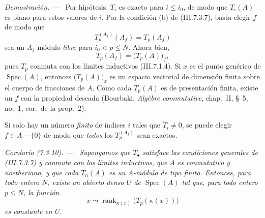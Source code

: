 \documentclass[10pt,oneside]{book}
\newcommand{\kres}{\kappa}
\newcommand{\Spec}{\operatorname{Spec}}
\newcommand{\sref}[2][]{\textup{(#2)}}
\newenvironment{corollary}[1][]{\par\medskip\noindent\itshape Corolario (#1). ---\ }{\par}
\newenvironment{proof}{\par\medskip\noindent\textit{Demostración. ---\ }}{\par}
\providecommand{\setmin}{-}%
\begin{document}
\begin{proof}
Por hipótesis, $T_i$ es exacto para $i\leq i_0$, de modo que
$T_i(A)$ es plano para estos valores de $i$. Por la condición (b) de
\sref{III.7.3.7}, basta elegir $f$ de modo que
\[
  T_p^{(A_f)}(A_f)=T_p(A_f)
\]
sea un $A_f$-módulo \emph{libre} para $i_0<p\leq N$. Ahora bien,
\[
  T_p(A_f)=\bigl(T_p(A)\bigr)_f,
\]
pues $T_p$ conmuta con los límites inductivos \sref{III.7.1.4}. Si
$x$ es el punto genérico de $\Spec(A)$, entonces
$\bigl(T_p(A)\bigr)_x$ es un espacio vectorial de dimensión finita
sobre el cuerpo de fracciones de $A$. Como cada $T_p(A)$ es de
presentación finita, existe un $f$ con la propiedad deseada
(Bourbaki, \emph{Alg\`ebre commutative}, chap.~II, \S~5,
no.~1, cor.\ de la prop.~2).

Si solo hay un número \emph{finito} de índices $i$ tales que $T_i\neq0$,
se puede elegir $f\in A\setmin\{0\}$ de modo que \emph{todos} los
$T_p^{(A_f)}$ sean exactos.
\end{proof}

\begin{corollary}[7.3.10]
\label{III.7.3.10}
Supongamos que $T_\bullet$ satisface las condiciones generales de
\sref{III.7.3.7} y conmuta con los límites inductivos, que $A$ es
conmutativo y noetheriano, y que cada $T_n(A)$ es un $A$-módulo de
tipo finito. Entonces, para todo entero $N$, existe un abierto denso
$U$ de $\Spec(A)$ tal que, para todo entero $p\leq N$, la función
\[
  x\leadsto
  \operatorname{rank}_{\kres(x)}
  \bigl(T_p(\kres(x))\bigr)
\]
es constante en $U$.
\end{corollary}
\end{document}
